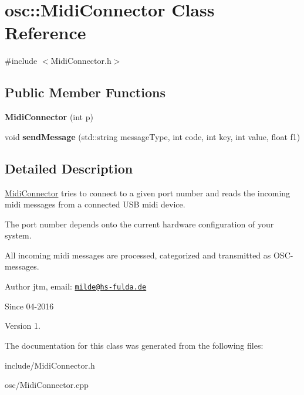 \hypertarget{classosc_1_1MidiConnector}{\section{osc\-:\-:Midi\-Connector Class Reference}
\label{classosc_1_1MidiConnector}
}


{\ttfamily \#include $<$Midi\-Connector.\-h$>$}

\subsection*{Public Member Functions}
\begin{DoxyCompactItemize}
\item 
\hypertarget{classosc_1_1MidiConnector_a1629e8c842409a21dbc78258794556cc}{{\bfseries Midi\-Connector} (int p)}\label{classosc_1_1MidiConnector_a1629e8c842409a21dbc78258794556cc}

\item 
\hypertarget{classosc_1_1MidiConnector_a700ee4383b29cd2bdc73f7cfc61a360e}{void {\bfseries send\-Message} (std\-::string message\-Type, int code, int key, int value, float f1)}\label{classosc_1_1MidiConnector_a700ee4383b29cd2bdc73f7cfc61a360e}

\end{DoxyCompactItemize}


\subsection{Detailed Description}
\hyperlink{classosc_1_1MidiConnector}{Midi\-Connector} tries to connect to a given port number and reads the incoming midi messages from a connected U\-S\-B midi device.

The port number depends onto the current hardware configuration of your system.

All incoming midi messages are processed, categorized and transmitted as O\-S\-C-\/messages.

\begin{DoxyAuthor}{Author}
jtm, email\-:  \href{mailto:milde@hs-fulda.de}{\tt milde@hs-\/fulda.\-de} 
\end{DoxyAuthor}
\begin{DoxySince}{Since}
04-\/2016 
\end{DoxySince}
\begin{DoxyVersion}{Version}
1. 
\end{DoxyVersion}


The documentation for this class was generated from the following files\-:\begin{DoxyCompactItemize}
\item 
include/Midi\-Connector.\-h\item 
osc/Midi\-Connector.\-cpp\end{DoxyCompactItemize}
